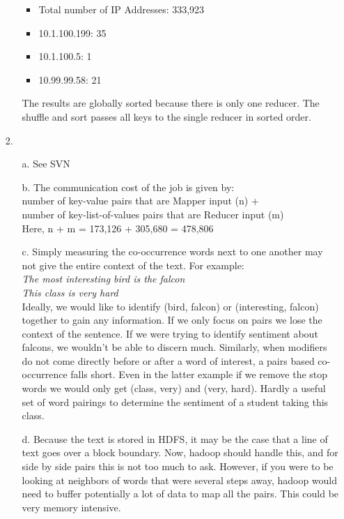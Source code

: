 \documentclass{article}
\begin{document}
\begin{itemize}
\begin{itemize}
	\begin{itemize}
	\item Total number of IP Addresses: 333,923
	\item 10.1.100.199: 35
	\item 10.1.100.5: 1
	\item 10.99.99.58: 21
	\end{itemize}
	The results are globally sorted because there is only one reducer. The shuffle and sort passes all keys to the single reducer in sorted order.	
	\end{itemize}	
\pagebreak
\item[2.]
	\begin{itemize}
	\item[a.] See SVN
	\item[b.] The communication cost of the job is given by:\\
		number of key-value pairs that are Mapper input (n) + \\
		number of key-list-of-values pairs that are Reducer input (m)\\
		Here, n + m = 173,126 + 305,680 = 478,806
	\item[c.] Simply measuring the co-occurrence words next to one another may not give the entire context of the text. For example:\\
		\textit{The most interesting bird is the falcon}\\
		\textit{This class is very hard}\\
		Ideally, we would like to identify (bird, falcon) or (interesting, falcon) together to gain any information. If we only focus on pairs we lose the context of the sentence. If we were trying to identify sentiment about falcons, we wouldn't be able to discern much. Similarly, when modifiers do not come directly before or after a word of interest, a pairs based co-occurrence falls short. Even in the latter example if we remove the stop words we would only get (class, very) and (very, hard). Hardly a useful set of word pairings to determine the sentiment of a student taking this class.
	\item[d.] Because the text is stored in HDFS, it may be the case that a line of text goes over a block boundary. Now, hadoop should handle this, and for side by side pairs this is not too much to ask. However, if you were to be looking at neighbors of words that were several steps away, hadoop would need to buffer potentially a lot of data to map all the pairs. This could be very memory intensive.
	\end{itemize}

	
\end{itemize}
\end{document}
